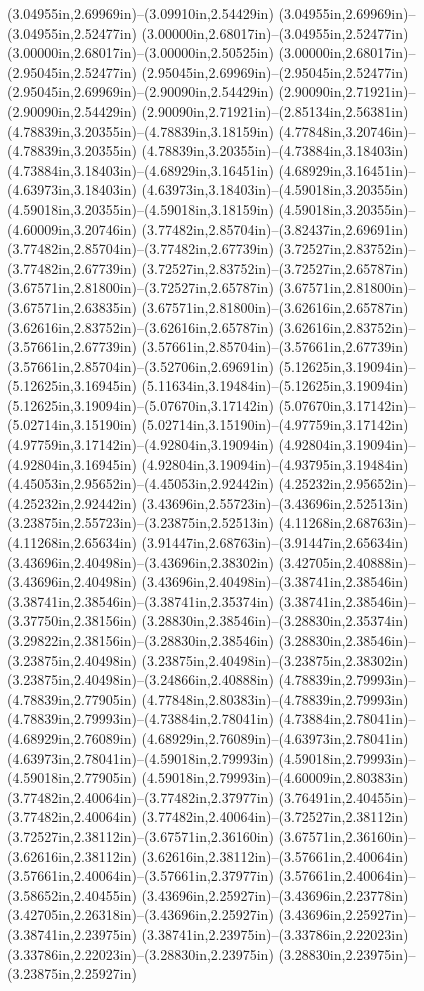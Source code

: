 (3.04955in,2.69969in)--(3.09910in,2.54429in) (3.04955in,2.69969in)--(3.04955in,2.52477in) (3.00000in,2.68017in)--(3.04955in,2.52477in) (3.00000in,2.68017in)--(3.00000in,2.50525in) (3.00000in,2.68017in)--(2.95045in,2.52477in) (2.95045in,2.69969in)--(2.95045in,2.52477in) (2.95045in,2.69969in)--(2.90090in,2.54429in) (2.90090in,2.71921in)--(2.90090in,2.54429in) (2.90090in,2.71921in)--(2.85134in,2.56381in) (4.78839in,3.20355in)--(4.78839in,3.18159in) (4.77848in,3.20746in)--(4.78839in,3.20355in) (4.78839in,3.20355in)--(4.73884in,3.18403in) (4.73884in,3.18403in)--(4.68929in,3.16451in) (4.68929in,3.16451in)--(4.63973in,3.18403in) (4.63973in,3.18403in)--(4.59018in,3.20355in) (4.59018in,3.20355in)--(4.59018in,3.18159in) (4.59018in,3.20355in)--(4.60009in,3.20746in) (3.77482in,2.85704in)--(3.82437in,2.69691in) (3.77482in,2.85704in)--(3.77482in,2.67739in) (3.72527in,2.83752in)--(3.77482in,2.67739in) (3.72527in,2.83752in)--(3.72527in,2.65787in) (3.67571in,2.81800in)--(3.72527in,2.65787in) (3.67571in,2.81800in)--(3.67571in,2.63835in) (3.67571in,2.81800in)--(3.62616in,2.65787in) (3.62616in,2.83752in)--(3.62616in,2.65787in) (3.62616in,2.83752in)--(3.57661in,2.67739in) (3.57661in,2.85704in)--(3.57661in,2.67739in) (3.57661in,2.85704in)--(3.52706in,2.69691in) (5.12625in,3.19094in)--(5.12625in,3.16945in) (5.11634in,3.19484in)--(5.12625in,3.19094in) (5.12625in,3.19094in)--(5.07670in,3.17142in) (5.07670in,3.17142in)--(5.02714in,3.15190in) (5.02714in,3.15190in)--(4.97759in,3.17142in) (4.97759in,3.17142in)--(4.92804in,3.19094in) (4.92804in,3.19094in)--(4.92804in,3.16945in) (4.92804in,3.19094in)--(4.93795in,3.19484in) (4.45053in,2.95652in)--(4.45053in,2.92442in) (4.25232in,2.95652in)--(4.25232in,2.92442in) (3.43696in,2.55723in)--(3.43696in,2.52513in) (3.23875in,2.55723in)--(3.23875in,2.52513in) (4.11268in,2.68763in)--(4.11268in,2.65634in) (3.91447in,2.68763in)--(3.91447in,2.65634in) (3.43696in,2.40498in)--(3.43696in,2.38302in) (3.42705in,2.40888in)--(3.43696in,2.40498in) (3.43696in,2.40498in)--(3.38741in,2.38546in) (3.38741in,2.38546in)--(3.38741in,2.35374in) (3.38741in,2.38546in)--(3.37750in,2.38156in) (3.28830in,2.38546in)--(3.28830in,2.35374in) (3.29822in,2.38156in)--(3.28830in,2.38546in) (3.28830in,2.38546in)--(3.23875in,2.40498in) (3.23875in,2.40498in)--(3.23875in,2.38302in) (3.23875in,2.40498in)--(3.24866in,2.40888in) (4.78839in,2.79993in)--(4.78839in,2.77905in) (4.77848in,2.80383in)--(4.78839in,2.79993in) (4.78839in,2.79993in)--(4.73884in,2.78041in) (4.73884in,2.78041in)--(4.68929in,2.76089in) (4.68929in,2.76089in)--(4.63973in,2.78041in) (4.63973in,2.78041in)--(4.59018in,2.79993in) (4.59018in,2.79993in)--(4.59018in,2.77905in) (4.59018in,2.79993in)--(4.60009in,2.80383in) (3.77482in,2.40064in)--(3.77482in,2.37977in) (3.76491in,2.40455in)--(3.77482in,2.40064in) (3.77482in,2.40064in)--(3.72527in,2.38112in) (3.72527in,2.38112in)--(3.67571in,2.36160in) (3.67571in,2.36160in)--(3.62616in,2.38112in) (3.62616in,2.38112in)--(3.57661in,2.40064in) (3.57661in,2.40064in)--(3.57661in,2.37977in) (3.57661in,2.40064in)--(3.58652in,2.40455in) (3.43696in,2.25927in)--(3.43696in,2.23778in) (3.42705in,2.26318in)--(3.43696in,2.25927in) (3.43696in,2.25927in)--(3.38741in,2.23975in) (3.38741in,2.23975in)--(3.33786in,2.22023in) (3.33786in,2.22023in)--(3.28830in,2.23975in) (3.28830in,2.23975in)--(3.23875in,2.25927in) 